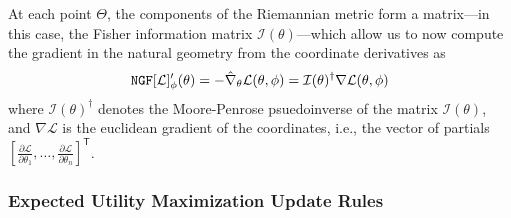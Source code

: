 At each point $\Theta$, the components of the Riemannian metric form a matrix---in this case, the Fisher information matrix $\mathcal I(\theta)$---which allow us to now compute the gradient in the natural geometry from the coordinate derivatives as
\[
	\mathtt{NGF}[\cal L]'_\phi (\theta) = - \hat \nabla_\theta \mathcal L(\theta,\phi)
		= \mathcal I(\theta)^{\dagger}  \nabla \mathcal L(\theta, \phi)
\]
where $ \mathcal I(\theta)^{\dagger} $ denotes the Moore-Penrose psuedoinverse of the matrix $ \mathcal I(\theta)$,
and $\nabla \mathcal L$ is the 
euclidean gradient of the coordinates, i.e., the vector of partials $[\frac{\partial \mathcal L}{\partial \theta_1}, %
 \ldots, \frac{\partial \mathcal L}{\partial \theta_n}]^{\mathsf T}$.



\subsubsection{Expected Utility Maximization Update Rules}


%
%

